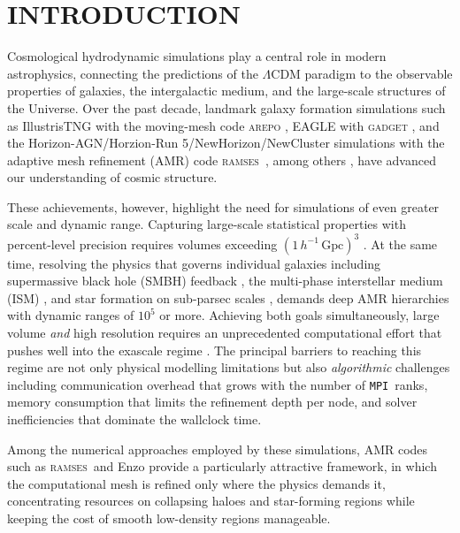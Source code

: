 \documentclass[fleqn,usenatbib]{mnras}
\newcommand{\ramses}{\textsc{ramses}}
\newcommand{\mpi}[0]{\texttt{MPI}}
\begin{document}
\section{INTRODUCTION}
\label{sec:intro}

Cosmological hydrodynamic simulations play a central role in modern
astrophysics, connecting the predictions of the $\Lambda$CDM paradigm
to the observable properties of galaxies, the intergalactic medium,
and the large-scale structures of the Universe. Over the past decade,
landmark galaxy formation simulations such as IllustrisTNG
\citep{Pillepich2018,Nelson2019} with the moving-mesh code \textsc{arepo}
\citep{Springel2010}, EAGLE \citep{Schaye2015} with \textsc{gadget}
\citep{Springel2005}, and the Horizon-AGN/Horzion-Run 5/NewHorizon/NewCluster simulations
\citep{Dubois2014,Lee2021,Dubois2021,Han2026} with the adaptive mesh refinement (AMR) code
\ramses\ \citep{Teyssier2002}, among others
\citep{Hopkins2018,Dave2019,Tremmel2017}, have advanced our
understanding of cosmic structure.

These achievements, however, highlight the need for simulations of
even greater scale and dynamic range.  Capturing large-scale
statistical properties with percent-level precision
\citep{Kim2011,Kim2015,Ishiyama2021,Maksimova2021,Schaye2015,Libeskind2018}
requires volumes exceeding $(1\,h^{-1}\,\mathrm{Gpc})^3$ \citep{Klypin2018, Klypin2019}.
At the same time, resolving the physics that governs individual
galaxies including supermassive black hole (SMBH) feedback
\citep{Dubois2012,Weinberger2017}, the multi-phase interstellar medium
(ISM) \citep{Springel2003}, and star formation on sub-parsec scales
\citep{Hopkins2014}, demands deep AMR hierarchies with dynamic ranges of
$10^5$ or more.
Achieving both goals simultaneously, large volume \emph{and} high
resolution requires an unprecedented computational effort that pushes
well into the exascale regime \citep{Habib2016,Frontiere2025}.
The principal barriers to reaching this regime are not only physical
modelling limitations but also \emph{algorithmic} challenges including
communication overhead that grows with the number of \mpi\ ranks, memory
consumption that limits the refinement depth per node, and solver
inefficiencies that dominate the wallclock time.

Among the numerical approaches employed by these simulations, AMR
codes such as \ramses\ and Enzo \citep{Bryan2014} provide a
particularly attractive framework, in which the
computational mesh is refined only where the physics demands it,
concentrating resources on collapsing haloes and star-forming regions
while keeping the cost of smooth low-density regions manageable.
\end{document}
